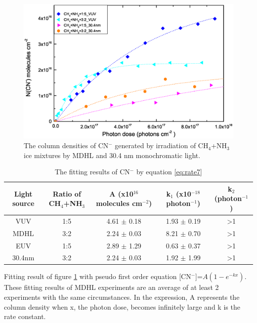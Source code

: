 \begin{figure}
\centering
\includegraphics[width=\textwidth]{figures/chapter3/overall_CN_NSRRC.eps}
\caption{The column densities of CN$^-$ generated by irradiation of CH$_4$+NH$_3$ ice mixtures by MDHL and 30.4 nm monochromatic light.}
\label{fig:CN_NSRRC}
\end{figure}

\begin{table}[htbp]
\caption{The fitting results of CN$^-$ by equation \ref{eq:rate7}}
\label{tab:CNrate}
\begin{tabular}{ccccc}
\hline
\hline
Light source & Ratio of CH$_4$+NH$_3$ & A (x10$^{16}$ molecules cm$^{-2}$) & k$_1$ (x10$^{-18}$ photon$^{-1}$) & k$_2$ (photon$^{-1}$)\\
\hline
VUV & 1:5 & 4.61 $\pm$ 0.18 & 1.93 $\pm$ 0.19 & >1 \\
MDHL & 3:2 & 2.24 $\pm$ 0.03 & 8.21 $\pm$ 0.70 & >1 \\
\hline
EUV & 1:5 & 2.89 $\pm$ 1.29 & 0.63 $\pm$ 0.37 & >1 \\
 30.4nm & 3:2 & 2.24 $\pm$ 0.03 & 1.92 $\pm$ 1.99 & >1 \\
\hline
\end{tabular}
Fitting result of figure \ref{fig:CN_NSRRC} with pseudo first order equation [CN$^-$]=$A(1-e^{-kx})$. These fitting results of MDHL experiments are an average of at least 2 experiments with the same circumstances. In the expression, A represents the column density when x, the photon dose, becomes infinitely large and k is the rate constant.\
\end{table}


